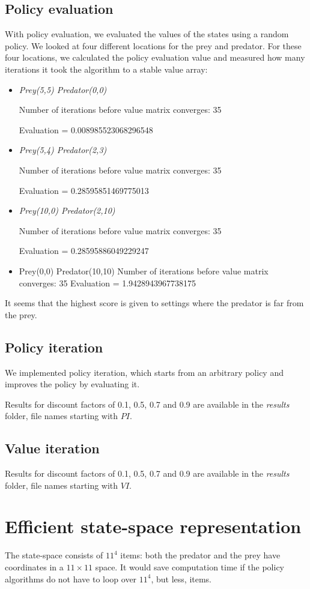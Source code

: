 \documentclass{article}
\begin{document}
\subsection{Policy evaluation}
With policy evaluation, we evaluated the values of the states using a random policy. We looked at four different locations for the prey and predator. For these four locations, we calculated the policy evaluation value and measured how many iterations it took the algorithm to a stable value array:

\begin{itemize}
\item \emph{Prey(5,5) Predator(0,0)}

Number of iterations before value matrix converges: 35

Evaluation = 0.008985523068296548

\item \emph{Prey(5,4) Predator(2,3)}

Number of iterations before value matrix converges: 35

Evaluation = 0.28595851469775013

\item \emph{Prey(10,0) Predator(2,10)}

Number of iterations before value matrix converges: 35

Evaluation = 0.28595886049229247

\item Prey(0,0) Predator(10,10)
Number of iterations before value matrix converges: 35
Evaluation = 1.9428943967738175
\end{itemize}

It seems that the highest score is given to settings where the predator is far from the prey.
\subsection{Policy iteration}
We implemented policy iteration, which starts from an arbitrary policy and improves the policy by evaluating it.

Results for discount factors of 0.1, 0.5, 0.7 and 0.9 are available in the \emph{results} folder, file names starting with $PI$.
\subsection{Value iteration}
Results for discount factors of 0.1, 0.5, 0.7 and 0.9 are available in the \emph{results} folder, file names starting with $VI$.
\section{Efficient state-space representation}
The state-space consists of $11^4$ items: both the predator and the prey have coordinates in a $11 \times 11$ space. It would save computation time if the policy algorithms do not have to loop over $11^4$, but less, items.
\end{document}
